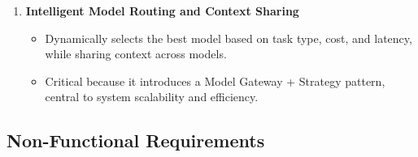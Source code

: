 \documentclass[12pt]{article}
\begin{document}
\begin{enumerate}
   \item \textbf{Intelligent Model Routing and Context Sharing}
   \begin{itemize}
      \item Dynamically selects the best model based on task type, cost, and latency, while sharing context across models.
      \item Critical because it introduces a Model Gateway + Strategy pattern, central to system scalability and efficiency.
   \end{itemize}
\end{enumerate}

\subsection{Non-Functional Requirements}
\end{document}
